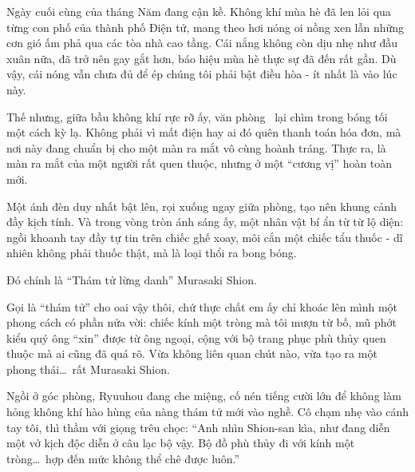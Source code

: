 \documentclass[../main.tex]{subfiles}
\begin{document}


Ngày cuối cùng của tháng Năm đang cận kề. Không khí mùa hè đã len lỏi qua từng con phố của thành phố Điện tử, mang theo hơi nóng oi nồng xen lẫn những cơn gió ấm phả qua các tòa nhà cao tầng. Cái nắng không còn dịu nhẹ như đầu xuân nữa, đã trở nên gay gắt hơn, báo hiệu mùa hè thực sự đã đến rất gần. Dù vậy, cái nóng vẫn chưa đủ để ép chúng tôi phải bật điều hòa - ít nhất là vào lúc này.

Thế nhưng, giữa bầu không khí rực rỡ ấy, văn phòng \hll\ lại chìm trong bóng tối một cách kỳ lạ. Không phải vì mất điện hay ai đó quên thanh toán hóa đơn, mà nơi này đang chuẩn bị cho một màn ra mắt vô cùng hoành tráng. Thực ra, là màn ra mắt của một người rất quen thuộc, nhưng ở một ``cương vị'' hoàn toàn mới.

Một ánh đèn duy nhất bật lên, rọi xuống ngay giữa phòng, tạo nên khung cảnh đầy kịch tính. Và trong vòng tròn ánh sáng ấy, một nhân vật bí ẩn từ từ lộ diện: ngồi khoanh tay đầy tự tin trên chiếc ghế xoay, môi cắn một chiếc tẩu thuốc - dĩ nhiên không phải thuốc thật, mà là loại thổi ra bong bóng.

Đó chính là ``Thám tử lừng danh'' Murasaki Shion.


Gọi là ``thám tử'' cho oai vậy thôi, chứ thực chất em ấy chỉ khoác lên mình một phong cách có phần nửa vời: chiếc kính một tròng mà tôi mượn từ bố, mũ phớt kiểu quý ông ``xin'' được từ ông ngoại, cộng với bộ trang phục phù thủy quen thuộc mà ai cũng đã quá rõ. Vừa không liên quan chút nào, vừa tạo ra một phong thái\dots\ rất Murasaki Shion.

Ngồi ở góc phòng, Ryuuhou đang che miệng, cố nén tiếng cười lớn để không làm hỏng không khí hào hùng của nàng thám tử mới vào nghề. Cô chạm nhẹ vào cánh tay tôi, thì thầm với giọng trêu chọc: ``Anh nhìn Shion-san kìa, như đang diễn một vở kịch độc diễn ở câu lạc bộ vậy. Bộ đồ phù thủy đi với kính một tròng\dots\ hợp đến mức không thể chê được luôn.''
\end{document}
